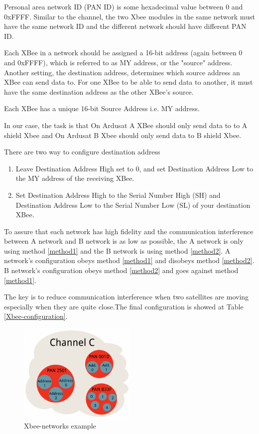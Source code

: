 Personal area network ID (PAN ID) is some hexadecimal value between 0 and 0xFFFF. Similar to the channel, the two Xbee modules in the same network must have the same network ID and the different network should have different PAN ID.

 Each XBee in a network should be assigned a 16-bit address (again between 0 and 0xFFFF), which is referred to as MY address, or the "source" address. Another setting, the destination address, determines which source address an XBee can send data to. For one XBee to be able to send data to another, it must have the same destination address as the other XBee's source.

Each XBee has a unique 16-bit Source Address i.e. MY address.

In our case, the task is that On Ardusat A XBee should only send data to to A shield Xbee and On Ardusat B Xbee should only send data to B shield Xbee.

There are two way to configure destination address
\begin{enumerate}
\item Leave Destination Address High set to 0, and set Destination Address Low to the MY address of the receiving XBee.\label{method1}

\item Set Destination Address High to the Serial Number High (SH) and Destination Address Low to the Serial Number Low (SL) of your destination XBee.\label{method2}
\end{enumerate}
To assure that each network has high fidelity and the communication interference between A network and B network is as low as possible, the A network is only using method \ref{method1} and the B network is using method \ref{method2}. A network's configuration obeys method \ref{method1} and disobeys method \ref{method2}. B network's configuration obeys method \ref{method2} and goes against method \ref{method1}.

The key is to reduce communication interference when two satellites are moving especially when they are quite close.The final configuration is showed at Table \ref{Xbee-configuration}.

\begin{figure}[ht]
\centering
\includegraphics[width = 0.5\textwidth]{fig/DOE/Network}
\caption{Xbee-networks example}\label{xbeenetworkexample}
\end{figure}

